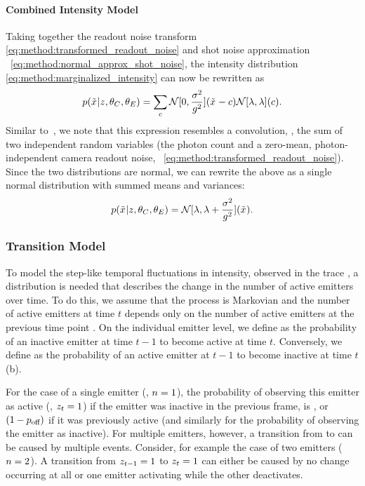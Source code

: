 \paragraph{Combined Intensity Model}

Taking together the readout noise transform
\eqref{eq:method:transformed_readout_noise} and shot noise approximation ~\eqref{eq:method:normal_approx_shot_noise}, the
intensity distribution \eqref{eq:method:marginalized_intensity} can now be
rewritten as
%
  \begin{equation}
    p(\tilde{x}_{}|z_{},\theta_C, \theta_E)
      = \sum_c
        \mathcal{N}[0, \frac{\sigma^2}{g^2}](\tilde{x}_{} - c)
        \mathcal{N}[\lambda, \lambda](c)
    \text{.}
  \end{equation}
  Similar to~\cite{huang_video-rate_2013}, we note that this expression
  resembles a convolution, \ie, the sum of two independent random variables
  (the photon count \photons and a zero-mean, photon-independent camera readout
  noise, ~\eqref{eq:method:transformed_readout_noise}). Since the two distributions are normal, we can rewrite
  the above as a single normal distribution with summed means and variances:
  \begin{equation}
    p(\tilde{x}_{}|z_{},\theta_C, \theta_E)
      = \mathcal{N}[\lambda, \lambda + \frac{\sigma^2}{g^2}](\tilde{x}_{})
    \text{.}
    \label{eq:method:combined_intensity}
  \end{equation}

\subsubsection{Transition Model}

To model the step-like temporal fluctuations in intensity, observed in
the trace \trace, a distribution is needed that describes the change in the
number of active emitters \z{} over time.
  To do this, we assume that the process is Markovian and the number of active
  emitters  at time $t$ depends only on the number of active emitters at
  the previous time point .
  On the individual emitter level, we define \pon as the probability of an
  inactive emitter at time $t-1$ to become active at time $t$.
  Conversely, we define \poff as the probability of an active emitter at $t-1$
  to become inactive at time $t$ (b).

For the case of a single emitter (\ie, $n=1$), the probability of observing
this emitter as active (\ie, $z_{t}=1$) if the emitter was
inactive in the previous frame, is \pon , or $(1-p_\text{off})$ if 
it was previously active (and similarly for the probability of observing 
the emitter as inactive).
  For multiple emitters, however, a transition from  to  can be
  caused by multiple events. Consider, for example the case of two emitters
  ($n=2$). A transition from $z_{t-1}=1$ to $z_{t}=1$ can either be caused by
  no change occurring at all or one emitter activating while the other
  deactivates.

